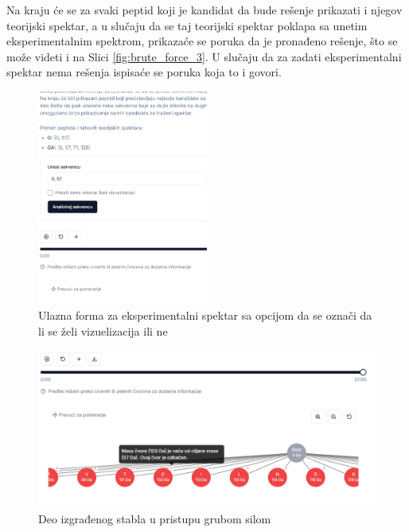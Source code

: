 \documentclass[12pt,oneside]{memoir}
\begin{document}
Na kraju će se za svaki peptid koji je kandidat da bude rešenje prikazati i njegov teorijski spektar, a u slučaju da se taj teorijski spektar poklapa sa unetim eksperimentalnim spektrom, prikazaće se poruka da je pronađeno rešenje, što se može videti i na Slici \ref{fig:brute_force_3}. U slučaju da za zadati eksperimentalni spektar nema rešenja ispisaće se poruka koja to i govori.
\clearpage
\begin{figure}[H]
\centering
\includegraphics[width=0.5\textwidth]{images/brute_force_2.png}
\caption{Ulazna forma za eksperimentalni spektar sa opcijom da se označi da li se želi vizuelizacija ili ne}
\label{fig:brute_force_2}
\end{figure}

\begin{figure}[H]
\centering
\includegraphics[width=1\textwidth]{images/brute_force_4.png}
\caption{Deo izgrađenog stabla u pristupu grubom silom}
\label{fig:brute_force_4}
\end{figure}
\end{document}
